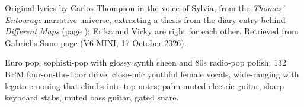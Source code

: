 
\label{sec:watching-the-play}
\begin{notes}
Original lyrics by Carlos Thompson in the voice of Sylvia, from the \emph{Thomas' Entourage} narrative universe, extracting a thesis from the diary entry behind \emph{Different Maps} (page \pageref{sec:different-maps}): Erika and Vicky are right for each other. Retrieved from Gabriel's Suno page (V6-MINI, 17 October 2026).
\end{notes}
\begin{style}
Euro pop, sophisti-pop with glossy synth sheen and 80s radio-pop polish; 132 BPM four-on-the-floor drive; close-mic youthful female vocals, wide-ranging with legato crooning that climbs into top notes; palm-muted electric guitar, sharp keyboard stabs, muted bass guitar, gated snare.
\end{style}
